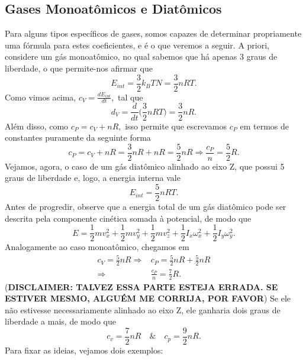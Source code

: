 \documentclass{article}
\begin{document}
\subsection{Gases Monoatômicos e Diatômicos} 
Para alguns tipos específicos de gases, somos capazes de determinar propriamente uma fórmula para estes coeficientes, e é o que veremos a seguir.
A priori, considere um gás monoatômico, no qual sabemos que há apenas 3 graus de liberdade, o que permite-nos afirmar que
\[
  E_{int} = \frac{3}{2}k_{B}TN = \frac{3}{2}nRT.
\]
Como vimos acima, \(c_{V} = \frac{dE_{int}}{dt},\) tal que 
\[
  d_{V} = \frac{d}{dt}\biggl(\frac{3}{2}nRT\biggr) = \frac{3}{2}nR.
\]
Além disso, como \(c_{P} = c_{V} + nR,\) isso permite que escrevamos \(c_{P}\) em termos de constantes puramente da seguinte
forma 
\[
  c_{P} = c_{V} + nR = \frac{3}{2}nR + nR = \frac{5}{2}nR \Rightarrow \frac{c_{P}}{n} = \frac{5}{2}R.
\]
Vejamos, agora, o caso de um gás diatômico alinhado ao eixo Z, que possui 5 graus de liberdade e, logo, a energia interna vale 
\[
  E_{int} = \frac{5}{2}nRT.
\]
Antes de progredir, observe que a energia total de um gás diatômico pode ser descrita pela componente cinética somada à potencial, de modo que 
\[
  E = \frac{1}{2}mv_{x}^{2} + \frac{1}{2}mv_{y}^{2} + \frac{1}{2}mv_{z}^{2} + \frac{1}{2}I_{x}\omega_{x}^{2} + \frac{1}{2}I_{y}\omega_{y}^{2}.
\]
Analogamente ao caso monoatômico, chegamos em 
\begin{align*}
  c_{V} = \frac{5}{2}nR \Rightarrow& c_{P} = \frac{5}{2}nR + \frac{5}{2}nR\\
  \Rightarrow& \frac{c_{P}}{n} = \frac{7}{2}R.
\end{align*}
(\textbf{DISCLAIMER: TALVEZ ESSA PARTE ESTEJA ERRADA. SE ESTIVER MESMO, ALGUÉM ME CORRIJA, POR FAVOR}) Se ele não estivesse necessariamente alinhado ao eixo Z, ele ganharia dois graus de liberdade a mais,
de modo que 
\[
  c_{v} = \frac{7}{2}nR \quad\&\quad c_{p} = \frac{9}{2}nR.
\]
Para fixar as ideias, vejamos dois exemplos:
\end{document}
